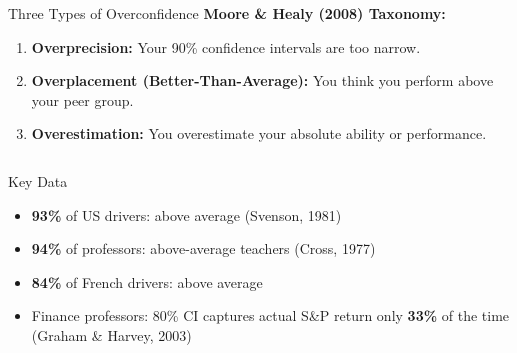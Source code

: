 \documentclass[aspectratio=169]{beamer}
\begin{document}
\begin{frame}{Three Types of Overconfidence}
\textcolor{beblue}{\textbf{Moore \& Healy (2008) Taxonomy:}}
\begin{enumerate}\small
  \item \textbf{Overprecision:} Your 90\% confidence intervals are too narrow.
  \item \textbf{Overplacement (Better-Than-Average):} You think you perform above your peer group.
  \item \textbf{Overestimation:} You overestimate your absolute ability or performance.
\end{enumerate}
\begin{columns}
\begin{alertblock}{Key Data}
\begin{itemize}\small
  \item \textbf{93\%} of US drivers: above average (Svenson, 1981)
  \item \textbf{94\%} of professors: above-average teachers (Cross, 1977)
  \item \textbf{84\%} of French drivers: above average
  \item Finance professors: 80\% CI captures actual S\&P return only \textbf{33\%} of the time (Graham \& Harvey, 2003)
\end{itemize}
\end{alertblock}
\end{columns}
\end{frame}
\end{document}
